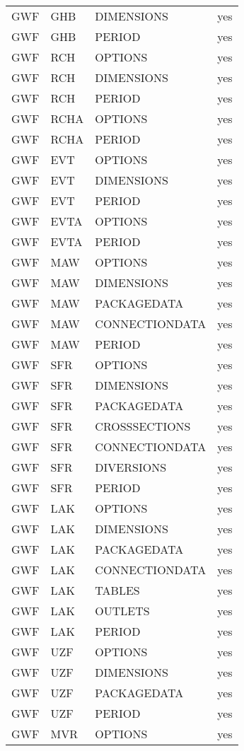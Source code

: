 \begin{longtable}{p{1.5cm} p{1.5cm} p{3cm} c}
GWF & GHB & DIMENSIONS & yes \\ 
GWF & GHB & PERIOD & yes \\ 
\hline
GWF & RCH & OPTIONS & yes \\ 
GWF & RCH & DIMENSIONS & yes \\ 
GWF & RCH & PERIOD & yes \\ 
\hline
GWF & RCHA & OPTIONS & yes \\ 
GWF & RCHA & PERIOD & yes \\ 
\hline
GWF & EVT & OPTIONS & yes \\ 
GWF & EVT & DIMENSIONS & yes \\ 
GWF & EVT & PERIOD & yes \\ 
\hline
GWF & EVTA & OPTIONS & yes \\ 
GWF & EVTA & PERIOD & yes \\ 
\hline
GWF & MAW & OPTIONS & yes \\ 
GWF & MAW & DIMENSIONS & yes \\ 
GWF & MAW & PACKAGEDATA & yes \\ 
GWF & MAW & CONNECTIONDATA & yes \\ 
GWF & MAW & PERIOD & yes \\ 
\hline
GWF & SFR & OPTIONS & yes \\ 
GWF & SFR & DIMENSIONS & yes \\ 
GWF & SFR & PACKAGEDATA & yes \\ 
GWF & SFR & CROSSSECTIONS & yes \\ 
GWF & SFR & CONNECTIONDATA & yes \\ 
GWF & SFR & DIVERSIONS & yes \\ 
GWF & SFR & PERIOD & yes \\ 
\hline
GWF & LAK & OPTIONS & yes \\ 
GWF & LAK & DIMENSIONS & yes \\ 
GWF & LAK & PACKAGEDATA & yes \\ 
GWF & LAK & CONNECTIONDATA & yes \\ 
GWF & LAK & TABLES & yes \\ 
GWF & LAK & OUTLETS & yes \\ 
GWF & LAK & PERIOD & yes \\ 
\hline
GWF & UZF & OPTIONS & yes \\ 
GWF & UZF & DIMENSIONS & yes \\ 
GWF & UZF & PACKAGEDATA & yes \\ 
GWF & UZF & PERIOD & yes \\ 
\hline
GWF & MVR & OPTIONS & yes \\ 

\end{longtable}
